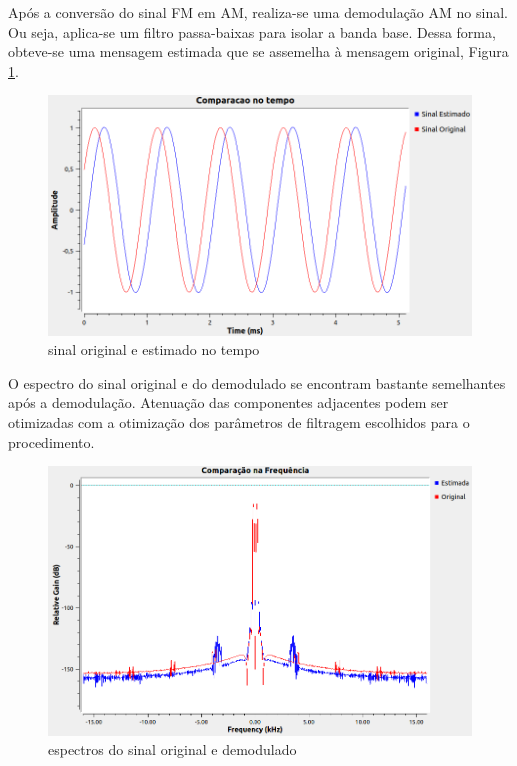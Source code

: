 Após a conversão do sinal FM em AM, realiza-se uma demodulação AM no sinal. Ou seja, aplica-se um filtro passa-baixas para isolar a banda base. Dessa forma, obteve-se uma mensagem estimada que se assemelha à mensagem original, Figura \ref{fig:resul_05}.

\begin{figure}[!htb]
    \centering
    \includegraphics[width=1\linewidth]{Imagens/fig:resul_05.png}
    \caption{sinal original e estimado no tempo}
    \label{fig:resul_05}
\end{figure}

O espectro do sinal original e do demodulado se encontram bastante semelhantes após a demodulação. Atenuação das componentes adjacentes podem ser otimizadas com a otimização dos parâmetros de filtragem escolhidos para o procedimento. 

\begin{figure}[!htb]
    \centering
    \includegraphics[width=1\linewidth]{Imagens/fig:resul_06.png}
    \caption{espectros do sinal original e demodulado}
    \label{fig:resul_06}
\end{figure}
